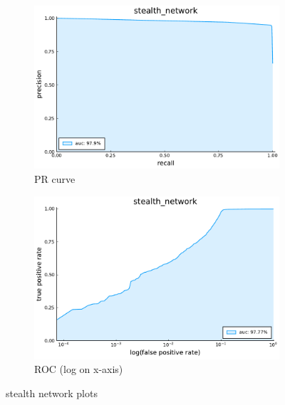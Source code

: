 \begin{figure}
    \centering
    \begin{subfigure}{.49\textwidth}
      \centering
      \includegraphics[width=1\linewidth]{pdfs/modperf/stealth_network.bson-pr.pdf}
      \caption{PR curve}
    \end{subfigure}
    \begin{subfigure}{.49\textwidth}
        \centering
        \includegraphics[width=1\linewidth]{pdfs/modperf/stealth_network.bson-roclog.pdf}
        \caption{ROC (log on x-axis)}
    \end{subfigure}
    \caption{stealth network plots}
    \label{fig:fig}
\end{figure}





